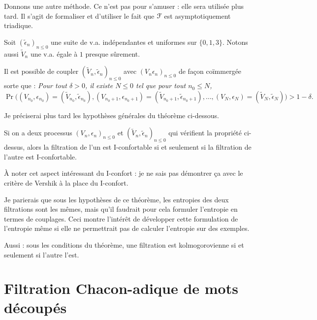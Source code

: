 \documentclass[12pt,a4paper]{article}
\begin{document}
Donnons une autre méthode. Ce n'est pas pour s'amuser : elle sera utilisée plus tard. 
Il s'agit de formaliser et d'utiliser le fait que $\EuScript{F}$ est asymptotiquement 
triadique. 

Soit ${(\widetilde{\epsilon}_n)}_{n \leq 0}$ une suite de v.a. indépendantes 
et uniformes sur $\{0,1,3\}$. Notons aussi $\widetilde{V}_n$ une v.a. égale à $1$ 
presque sûrement. 

Il est possible de coupler ${(\widetilde{V}_n, \widetilde{\epsilon}_n)}_{n \leq 0}$ 
avec ${(V_n \epsilon_n)}_{n \leq 0}$ de façon coïmmergée sorte que : 
{\it Pour tout $\delta >0$, il existe $N \leq 0$ tel que pour tout $n_0 \leq N$,}
$$
\Pr\bigl((V_{n_0}, \epsilon_{n_0})=(\widetilde{V}_{n_0}, \widetilde{\epsilon}_{n_0}), (V_{n_0+1}, \epsilon_{n_0+1})=(\widetilde{V}_{n_0+1},\widetilde{\epsilon}_{n_0+1}), \ldots, (V_N, \epsilon_{N})=(\widetilde{V}_{N},\widetilde{\epsilon}_{N})\bigr) > 1-\delta. 
$$ 

Je préciserai plus tard les hypothèses générales du théorème ci-dessous. 

\begin{thm}\label{thm:joining}
Si on a deux processus ${(V_n, \epsilon_n)}_{n \leq 0}$ et ${(\widetilde{V}_n, \widetilde{\epsilon}_n)}_{n \leq 0}$ qui vérifient la propriété ci-dessus, 
alors la filtration de l'un est I-confortable si et seulement si 
la filtration de l'autre est I-confortable.
\end{thm} 

À noter cet aspect intéressant du I-confort : 
je ne sais pas démontrer ça avec le critère de Vershik à la place du I-confort. 

Je parierais que sous les hypothèses de ce théorème, les entropies des deux 
filtrations sont les mêmes, mais qu'il faudrait pour cela formuler l'entropie en 
termes de couplages. Ceci montre l'intérêt de développer cette formulation 
de l'entropie même si elle ne permettrait pas de calculer l'entropie sur des exemples.

Aussi : sous les conditions du théorème, une filtration est kolmogorovienne si et seulement 
si l'autre l'est. 

\section{Filtration Chacon-adique de mots découpés}
\end{document}
